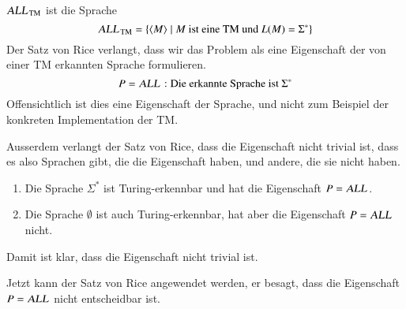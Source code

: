 \begin{beispiel}
%
$\text{\textsl{ALL}}_{\text{TM}}$ ist die Sprache
\[
\text{\textsl{ALL}}_{\text{TM}}=\{
\langle M\rangle\;|\; \text{$M$ ist eine TM und $L(M)=\Sigma^*$}
\}
\]
Der Satz von Rice verlangt, dass wir das Problem als eine Eigenschaft
der von einer TM erkannten Sprache formulieren.
\[
P=\text{\textsl{ALL}}:\text{Die erkannte Sprache ist $\Sigma^*$}
\]
Offensichtlich ist dies eine Eigenschaft der Sprache, und nicht zum
Beispiel der konkreten Implementation der TM.

Ausserdem verlangt der Satz von Rice, dass die Eigenschaft nicht trivial ist,
dass es also Sprachen gibt, die die Eigenschaft haben, und andere, die
sie nicht haben.
\begin{enumerate}
\item Die Sprache $\Sigma^*$ ist Turing-erkennbar und hat die Eigenschaft
$P=\text{\textsl{ALL}}$.
\item Die Sprache $\emptyset$ ist auch Turing-erkennbar, hat aber die
Eigenschaft
$P=\text{\textsl{ALL}}$ nicht.
\end{enumerate}
Damit ist klar, dass die Eigenschaft nicht trivial ist.

Jetzt kann der Satz von Rice angewendet werden, er besagt, dass die
Eigenschaft
$P=\text{\textsl{ALL}}$ nicht entscheidbar ist.
\end{beispiel}


